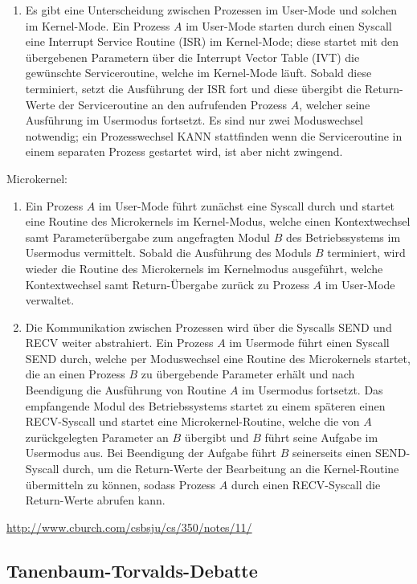 \documentclass[numbers=noendperiod]{scrartcl}
\begin{document}
\begin{enumerate}[1)]
\begin{enumerate}
			\item Es gibt eine Unterscheidung zwischen Prozessen im User-Mode und solchen im Kernel-Mode. Ein Prozess $A$ im User-Mode starten durch einen Syscall eine Interrupt Service Routine (ISR) im Kernel-Mode; diese startet mit den übergebenen Parametern über die Interrupt Vector Table (IVT) die gewünschte Serviceroutine, welche im Kernel-Mode läuft. Sobald diese terminiert, setzt die Ausführung der ISR fort und diese übergibt die Return-Werte der Serviceroutine an den aufrufenden Prozess $A$, welcher seine Ausführung im Usermodus fortsetzt. Es sind nur zwei Moduswechsel notwendig; ein Prozesswechsel KANN stattfinden wenn die Serviceroutine in einem separaten Prozess gestartet wird, ist aber nicht zwingend.
		\end{enumerate}
		Microkernel:
		\begin{enumerate}
			\item Ein Prozess $A$ im User-Mode führt zunächst eine Syscall durch und startet eine Routine des Microkernels im Kernel-Modus, welche einen Kontextwechsel samt Parameterübergabe zum angefragten Modul $B$ des Betriebssystems im Usermodus vermittelt. Sobald die Ausführung des Moduls $B$ terminiert, wird wieder die Routine des Microkernels im Kernelmodus ausgeführt, welche Kontextwechsel samt Return-Übergabe zurück zu Prozess $A$ im User-Mode verwaltet.
			
			\item Die Kommunikation zwischen Prozessen wird über die Syscalls SEND und RECV weiter abstrahiert. Ein Prozess $A$ im Usermode führt einen Syscall SEND durch, welche per Moduswechsel eine Routine des Microkernels startet, die an einen Prozess $B$ zu übergebende Parameter erhält und nach Beendigung die Ausführung von Routine $A$ im Usermodus fortsetzt. Das empfangende Modul des Betriebssystems startet zu einem späteren einen RECV-Syscall und startet eine Microkernel-Routine, welche die von $A$ zurückgelegten Parameter an $B$ übergibt und $B$ führt seine Aufgabe im Usermodus aus. Bei Beendigung der Aufgabe führt $B$ seinerseits einen SEND-Syscall durch, um die Return-Werte der Bearbeitung an die Kernel-Routine übermitteln zu können, sodass Prozess $A$ durch einen RECV-Syscall die Return-Werte abrufen kann.
		\end{enumerate}
	
	\url{http://www.cburch.com/csbsju/cs/350/notes/11/}
	\end{enumerate}

\subsection*{Tanenbaum-Torvalds-Debatte}
\end{document}
